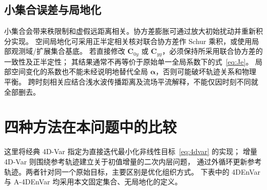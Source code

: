 \documentclass[11pt,a4paper]{article}
\newcommand{\avec}{\bm\alpha}
\begin{document}
\subsection{小集合误差与局地化}

小集合会带来秩限制和虚假远距离相关。协方差膨胀可通过放大初始扰动并重新积分实现。
空间局地化可采用正半定相关核对联合协方差作 Schur 乘积，或使用局部观测域/扩展集合基底。
若直接修改 $\mathbf C_{0y}$ 或 $\mathbf C_{yy}$，必须保持所采用联合协方差的一致性及正半定性；
其结果通常不再等价于原始单一全局系数下的式~\eqref{eq:Je}。
局部空间变化的系数也不能未经说明地替代全局 $\avec$，否则可能破坏轨迹关系和物理平衡。
跨时刻相关应结合浅水波传播距离及流场平流解释，不能仅因时刻不同就全部删去。

\section{四种方法在本问题中的比较}

这里将经典 4D-Var 指定为直接迭代最小化非线性目标~\eqref{eq:4dvar} 的实现；
增量 4D-Var 则围绕参考轨迹建立关于初值增量的二次内层问题，
通过外循环更新参考轨迹。两者针对同一个原始目标，主要区别是优化组织方式。
下表中的 4DEnVar 与 A-4DEnVar 均采用本文固定集合、无局地化的定义。
\end{document}
